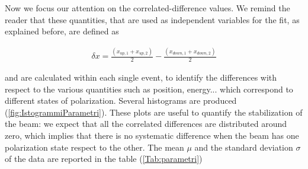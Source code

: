 \begin{figure}[hbtp]
\centering
{}
\end{figure}

Now we focus our attention on the correlated-difference values. We remind the reader that these quantities, that are used as independent variables for the fit, as explained before, are defined as 

\begin{align*}
\delta x =  \frac{(x_{up,1} + x_{up,2})}{2} - \frac{(x_{down,1} + x_{down,2})}{2}
\end{align*}

and are calculated within each single event, to identify the differences with respect to the various quantities such as position, energy... which correspond to different states of polarization.
Several histograms are produced (\ref{fig:IstogrammiParametri}). These plots are useful to quantify the stabilization of the beam: we expect that all the correlated differences are distributed around zero, which implies that there is no systematic difference when the beam has one polarization state respect to the other. The mean $\mu$ and the standard deviation $\sigma$ of the data are reported in the table (\ref{Tab:parametri}) 

